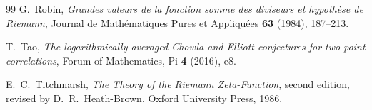 \documentclass[11pt]{amsart}
\numberwithin{equation}{section}
\theoremstyle{plain}
\theoremstyle{definition}
\theoremstyle{remark}
\begin{document}
\begin{thebibliography}{99}
G.~Robin,
\emph{Grandes valeurs de la fonction somme des diviseurs et hypoth\`ese
de Riemann},
Journal de Math\'ematiques Pures et Appliqu\'ees \textbf{63} (1984),
187--213.

T.~Tao,
\emph{The logarithmically averaged Chowla and Elliott conjectures for
two-point correlations},
Forum of Mathematics, Pi \textbf{4} (2016), e8.

E.~C.~Titchmarsh,
\emph{The Theory of the Riemann Zeta-Function}, second edition,
revised by D.~R.~Heath-Brown,
Oxford University Press, 1986.

\end{thebibliography}

\label{sec:bibliography}
\end{document}
